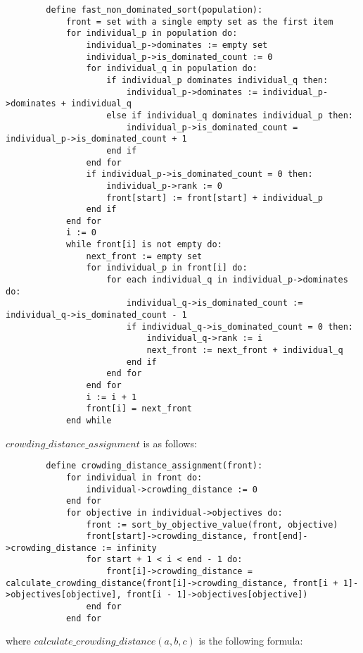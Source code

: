 \documentclass{article}
\begin{document}
    \begin{lstlisting}
        define fast_non_dominated_sort(population):
            front = set with a single empty set as the first item
            for individual_p in population do:
                individual_p->dominates := empty set
                individual_p->is_dominated_count := 0
                for individual_q in population do:
                    if individual_p dominates individual_q then:
                        individual_p->dominates := individual_p->dominates + individual_q
                    else if individual_q dominates individual_p then:
                        individual_p->is_dominated_count = individual_p->is_dominated_count + 1
                    end if
                end for
                if individual_p->is_dominated_count = 0 then:
                    individual_p->rank := 0
                    front[start] := front[start] + individual_p
                end if
            end for
            i := 0
            while front[i] is not empty do:
                next_front := empty set
                for individual_p in front[i] do:
                    for each individual_q in individual_p->dominates do:
                        individual_q->is_dominated_count := individual_q->is_dominated_count - 1
                        if individual_q->is_dominated_count = 0 then:
                            individual_q->rank := i
                            next_front := next_front + individual_q
                        end if
                    end for
                end for
                i := i + 1
                front[i] = next_front
            end while
    \end{lstlisting}
    \(crowding\_distance\_assignment\) is as follows:
    \begin{lstlisting}
        define crowding_distance_assignment(front):
            for individual in front do:
                individual->crowding_distance := 0
            end for
            for objective in individual->objectives do:
                front := sort_by_objective_value(front, objective)
                front[start]->crowding_distance, front[end]->crowding_distance := infinity
                for start + 1 < i < end - 1 do:
                    front[i]->crowding_distance = calculate_crowding_distance(front[i]->crowding_distance, front[i + 1]->objectives[objective], front[i - 1]->objectives[objective])
                end for
            end for
    \end{lstlisting}
    where \(calculate\_crowding\_distance(a, b, c)\) is the following formula:
\end{document}
